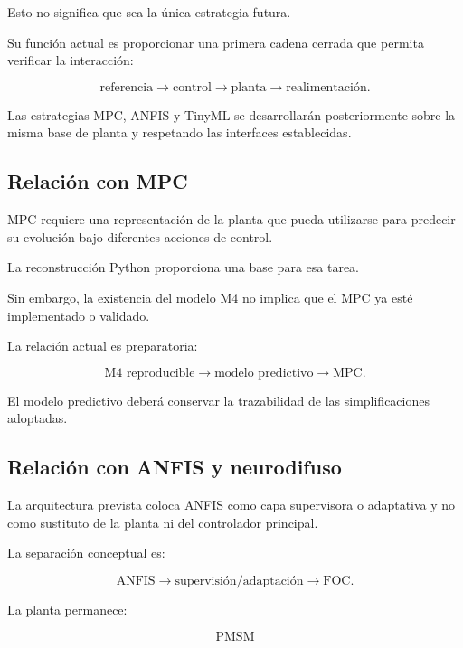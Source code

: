 Esto no significa que sea la única estrategia futura.

Su función actual es proporcionar una primera cadena cerrada que permita verificar la interacción:

\begin{equation}
\text{referencia}
\rightarrow
\text{control}
\rightarrow
\text{planta}
\rightarrow
\text{realimentación}.
\end{equation}

Las estrategias MPC, ANFIS y TinyML se desarrollarán posteriormente sobre la misma base de planta y respetando las interfaces establecidas.

\subsection{Relación con MPC}

MPC requiere una representación de la planta que pueda utilizarse para predecir su evolución bajo diferentes acciones de control.

La reconstrucción Python proporciona una base para esa tarea.

Sin embargo, la existencia del modelo M4 no implica que el MPC ya esté implementado o validado.

La relación actual es preparatoria:

\begin{equation}
\text{M4 reproducible}
\rightarrow
\text{modelo predictivo}
\rightarrow
\text{MPC}.
\end{equation}

El modelo predictivo deberá conservar la trazabilidad de las simplificaciones adoptadas.

\subsection{Relación con ANFIS y neurodifuso}

La arquitectura prevista coloca ANFIS como capa supervisora o adaptativa y no como sustituto de la planta ni del controlador principal.

La separación conceptual es:

\begin{equation}
\text{ANFIS}
\rightarrow
\text{supervisión/adaptación}
\rightarrow
\text{FOC}.
\end{equation}

La planta permanece:

\begin{equation}
\text{PMSM}
\end{equation}

